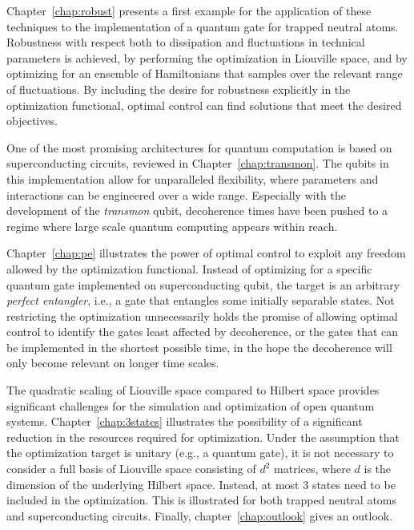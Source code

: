 Chapter~\ref{chap:robust} presents a first example for the application of these
techniques to the implementation of a quantum gate for trapped neutral atoms.
Robustness with respect both to dissipation and fluctuations in technical
parameters is achieved, by performing the optimization in Liouville space, and
by optimizing for an ensemble of Hamiltonians that samples over the relevant
range of fluctuations. By including the desire for robustness explicitly in the
optimization functional, optimal control can find solutions that meet the
desired objectives.

One of the most promising architectures for quantum computation is based on
superconducting circuits, reviewed in Chapter~\ref{chap:transmon}. The qubits in
this implementation allow for unparalleled flexibility, where parameters
and interactions can be engineered over a wide range. Especially with
the development of the \emph{transmon} qubit, decoherence times have been pushed
to a regime where large scale quantum computing appears within reach.

Chapter~\ref{chap:pe} illustrates the power of optimal control to exploit
any freedom allowed by the optimization functional. Instead of optimizing for
a specific quantum gate implemented on superconducting qubit, the target is an
arbitrary \emph{perfect entangler}, i.e., a gate that entangles some initially
separable states. Not restricting the optimization unnecessarily holds the
promise of allowing optimal control to identify the gates least affected by
decoherence, or the gates that can be implemented in the shortest possible time,
in the hope the decoherence will only become relevant on longer time scales.

The quadratic scaling of Liouville space compared to Hilbert space provides
significant challenges for the simulation and optimization of open quantum
systems. Chapter~\ref{chap:3states} illustrates the possibility of a significant
reduction in the resources required for optimization. Under the assumption that
the optimization target is unitary (e.g., a quantum gate), it is not necessary
to consider a full basis of Liouville space consisting of $d^2$ matrices, where
$d$ is the dimension of the underlying Hilbert space. Instead, at most 3 states
need to be included in the optimization. This is illustrated for both trapped
neutral atoms and superconducting circuits.
Finally, chapter~\ref{chap:outlook} gives an outlook.

